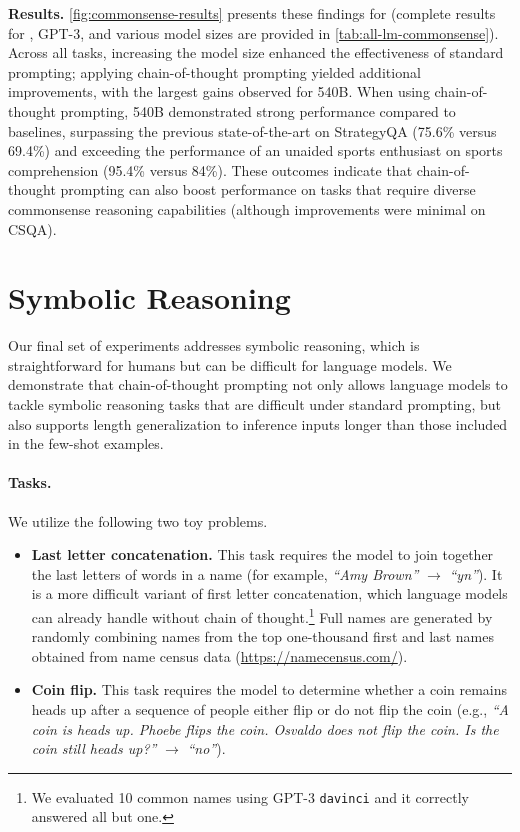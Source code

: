 \textbf{Results.} 
\cref{fig:commonsense-results} presents these findings for \palm{} (complete results for \lamda{}, GPT-3, and various model sizes are provided in \cref{tab:all-lm-commonsense}). 
Across all tasks, increasing the model size enhanced the effectiveness of standard prompting; applying chain-of-thought prompting yielded additional improvements, with the largest gains observed for \palm{} 540B. When using chain-of-thought prompting, \palm{} 540B demonstrated strong performance compared to baselines, surpassing the previous state-of-the-art on StrategyQA (75.6\% versus 69.4\%) and exceeding the performance of an unaided sports enthusiast on sports comprehension (95.4\% versus 84\%). 
These outcomes indicate that chain-of-thought prompting can also boost performance on tasks that require diverse commonsense reasoning capabilities (although improvements were minimal on CSQA).



 
\section{Symbolic Reasoning}\label{sec:symbolic-reasoning} 
Our final set of experiments addresses symbolic reasoning, which is straightforward for humans but can be difficult for language models. We demonstrate that chain-of-thought prompting not only allows language models to tackle symbolic reasoning tasks that are difficult under standard prompting, but also supports length generalization to inference inputs longer than those included in the few-shot examples.

\paragraph{Tasks.} 
We utilize the following two toy problems.

\begin{itemize}[leftmargin=*,topsep=0pt]
    \itemsep0em \item \textbf{Last letter concatenation.} This task requires the model to join together the last letters of words in a name (for example, \textit{``Amy Brown''} $\rightarrow$ \textit{``yn''}). 
    It is a more difficult variant of first letter concatenation, which language models can already handle without chain of thought.\footnote{We evaluated 10 common names using GPT-3 \texttt{davinci} and it correctly answered all but one.} Full names are generated by randomly combining names from the top one-thousand first and last names obtained from name census data ({\small{\url{https://namecensus.com/}}}).
    \item \textbf{Coin flip.} This task requires the model to determine whether a coin remains heads up after a sequence of people either flip or do not flip the coin (e.g., \textit{``A coin is heads up. Phoebe flips the coin. Osvaldo does not flip the coin. Is the coin still heads up?''} $\rightarrow$ \textit{``no''}).
\end{itemize}

